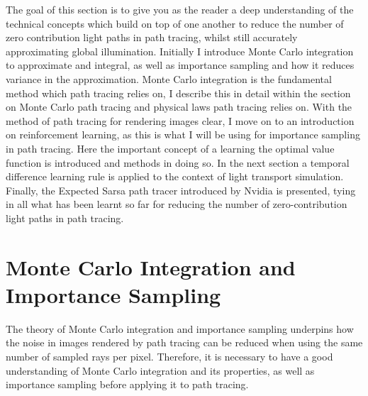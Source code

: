 \documentclass[ %
                    author={Callum Pearce},
                supervisor={Dr. Neill Campbell},
                    degree={MEng},
                     title={How effective are Temporal difference learning methods for reducing the number of zero contribution light paths, while still accurately approximating Global Illumination in Path tracing?},
                  subtitle={},
                      type={research},
                      year={2019} ]{dissertation}
\begin{document}
The goal of this section is to give you as the reader a deep understanding of the technical concepts which build on top of one another to reduce the number of zero contribution light paths in path tracing, whilst still accurately approximating global illumination. Initially I introduce Monte Carlo integration to approximate and integral, as well as importance sampling and how it reduces variance in the approximation. Monte Carlo integration is the fundamental method which path tracing relies on, I describe this in detail within the section on Monte Carlo path tracing and physical laws path tracing relies on. With the method of path tracing for rendering images clear, I move on to an introduction on reinforcement learning, as this is what I will be using for importance sampling in path tracing. Here the important concept of a learning the optimal value function is introduced and methods in doing so. In the next section a temporal difference learning rule is applied to the context of light transport simulation. Finally, the Expected Sarsa path tracer introduced by Nvidia \cite{dahm2017learning} is presented, tying in all what has been learnt so far for reducing the number of zero-contribution light paths in path tracing. 

\section{Monte Carlo Integration and Importance Sampling}
\label{sec:monte_carlo}
The theory of Monte Carlo integration and importance sampling underpins how the noise in images rendered by path tracing can be reduced when using the same number of sampled rays per pixel. Therefore, it is necessary to have a good understanding of Monte Carlo integration and its properties, as well as importance sampling before applying it to path tracing.
\end{document}
